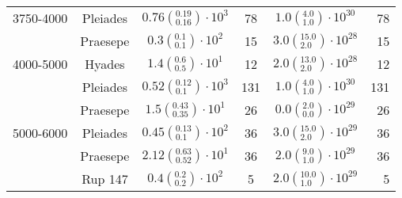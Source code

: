 \begin{tabular}{lccccr}
3750-4000 & Pleiades &  $0.76\left(^{0.19}_{0.16}\right)\cdot 10^{3}$ &             78 &   $1.0\left(^{4.0}_{1.0}\right)\cdot 10^{30}$ &               78 \\
          & Praesepe &     $0.3\left(^{0.1}_{0.1}\right)\cdot 10^{2}$ &             15 &  $3.0\left(^{15.0}_{2.0}\right)\cdot 10^{28}$ &               15 \\
4000-5000 & Hyades &     $1.4\left(^{0.6}_{0.5}\right)\cdot 10^{1}$ &             12 &  $2.0\left(^{13.0}_{2.0}\right)\cdot 10^{28}$ &               12 \\
          & Pleiades &   $0.52\left(^{0.12}_{0.1}\right)\cdot 10^{3}$ &            131 &   $1.0\left(^{4.0}_{1.0}\right)\cdot 10^{30}$ &              131 \\
          & Praesepe &   $1.5\left(^{0.43}_{0.35}\right)\cdot 10^{1}$ &             26 &   $0.0\left(^{2.0}_{0.0}\right)\cdot 10^{29}$ &               26 \\
5000-6000 & Pleiades &   $0.45\left(^{0.13}_{0.1}\right)\cdot 10^{2}$ &             36 &  $3.0\left(^{15.0}_{2.0}\right)\cdot 10^{29}$ &               36 \\
          & Praesepe &  $2.12\left(^{0.63}_{0.52}\right)\cdot 10^{1}$ &             36 &   $2.0\left(^{9.0}_{1.0}\right)\cdot 10^{29}$ &               36 \\
          & Rup 147 &     $0.4\left(^{0.2}_{0.2}\right)\cdot 10^{2}$ &              5 &  $2.0\left(^{10.0}_{1.0}\right)\cdot 10^{29}$ &                5 \\
\hline

\end{tabular}

